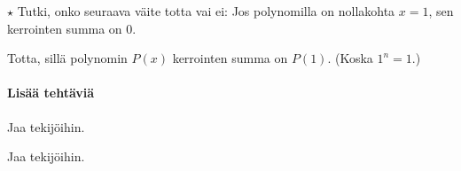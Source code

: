 \begin{tehtavasivu}
\begin{tehtava}
\begin{alakohdat}
    \end{alakohdat}
    \begin{vastaus}
        \begin{alakohdat}
        \end{alakohdat}
    \end{vastaus}
\end{tehtava}

\begin{tehtava}
    $\star $ Tutki, onko seuraava väite totta vai ei: Jos polynomilla on
    nollakohta $x=1$,
	sen kerrointen summa on $0$. 
    \begin{vastaus}
        Totta, sillä polynomin $P(x)$ kerrointen summa on $P(1)$. (Koska $1^n=1$.)
    \end{vastaus}
\end{tehtava}

\paragraph*{Lisää tehtäviä}

\begin{tehtava}
    Jaa tekijöihin.
    \begin{alakohdat}
    \end{alakohdat}
    \begin{vastaus}
        \begin{alakohdat}
        \end{alakohdat}
    \end{vastaus}
\end{tehtava}

\begin{tehtava}
	Jaa tekijöihin.
	\begin{alakohdat}
	\end{alakohdat}
	\begin{vastaus}
		\begin{alakohdat}
			\alakohta{$(x-3)(x+2)$}
			\alakohta{$(x-1)(x-7)$}
		\end{alakohdat}
	\end{vastaus}
\end{tehtava}


\end{tehtavasivu}
